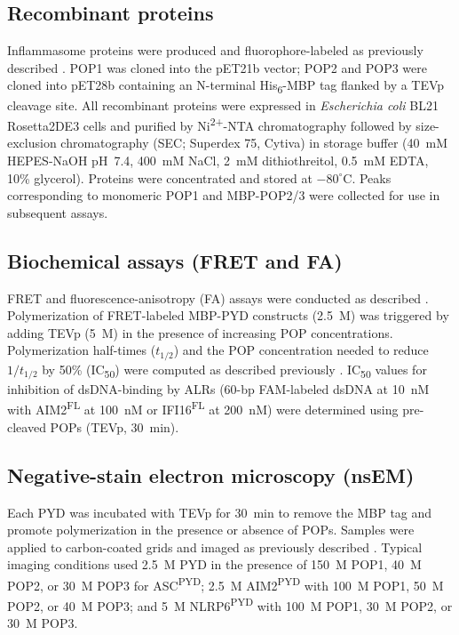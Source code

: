 \documentclass[11pt]{article}
\begin{document}
\subsection{Recombinant proteins}
Inflammasome proteins were produced and fluorophore-labeled as previously described \citep{matyszewski2018,matyszewski2021,morrone2014,morrone2015}. POP1 was cloned into the pET21b vector; POP2 and POP3 were cloned into pET28b containing an N-terminal His\textsubscript{6}-MBP tag flanked by a TEVp cleavage site. All recombinant proteins were expressed in \textit{Escherichia coli} BL21 Rosetta2DE3 cells and purified by Ni\textsuperscript{2+}-NTA chromatography followed by size-exclusion chromatography (SEC; Superdex 75, Cytiva) in storage buffer (40~mM HEPES-NaOH pH~7.4, 400~mM NaCl, 2~mM dithiothreitol, 0.5~mM EDTA, 10\% glycerol). Proteins were concentrated and stored at $-80^\circ$C. Peaks corresponding to monomeric POP1 and MBP-POP2/3 were collected for use in subsequent assays.

\subsection{Biochemical assays (FRET and FA)}
FRET and fluorescence-anisotropy (FA) assays were conducted as described \citep{matyszewski2018,matyszewski2021,mazanek2019,morrone2014}. Polymerization of FRET-labeled MBP-PYD constructs (2.5~\textmu M) was triggered by adding TEVp (5~\textmu M) in the presence of increasing POP concentrations. Polymerization half-times ($t_{1/2}$) and the POP concentration needed to reduce $1/t_{1/2}$ by 50\% (IC\textsubscript{50}) were computed as described previously \citep{matyszewski2018,matyszewski2021}. IC\textsubscript{50} values for inhibition of dsDNA-binding by ALRs (60-bp FAM-labeled dsDNA at 10~nM with AIM2\textsuperscript{FL} at 100~nM or IFI16\textsuperscript{FL} at 200~nM) were determined using pre-cleaved POPs (TEVp, 30~min).

\subsection{Negative-stain electron microscopy (nsEM)}
Each PYD was incubated with TEVp for 30~min to remove the MBP tag and promote polymerization in the presence or absence of POPs. Samples were applied to carbon-coated grids and imaged as previously described \citep{matyszewski2018,matyszewski2019,morrone2015}. Typical imaging conditions used 2.5~\textmu M PYD in the presence of 150~\textmu M POP1, 40~\textmu M POP2, or 30~\textmu M POP3 for ASC\textsuperscript{PYD}; 2.5~\textmu M AIM2\textsuperscript{PYD} with 100~\textmu M POP1, 50~\textmu M POP2, or 40~\textmu M POP3; and 5~\textmu M NLRP6\textsuperscript{PYD} with 100~\textmu M POP1, 30~\textmu M POP2, or 30~\textmu M POP3.
\end{document}
